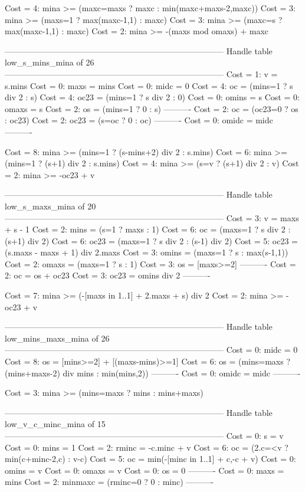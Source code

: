 Cost =  4:  mina >= (maxc=maxs ? maxc : min(maxc+maxs-2,maxc))
Cost =  3:  mina >= (maxs=1 ? max(maxc-1,1) : maxc)
Cost =  3:  mina >= (maxc=s ? max(maxc-1,1) : maxc)
Cost =  2:  mina >= -(maxs mod omaxs) + maxc

--------------------------------------------------------------------------------
Handle table low_s_mins_mina of 26
--------------------------------------------------------------------------------
Cost =  1:  v     = s.mins
Cost =  0:  maxs  = mins
Cost =  0:  midc  = 0
Cost =  4:  oc    = (mins=1 ? s div 2 : s)
Cost =  4:  oc23  = (mins=1 ? s div 2 : 0)
Cost =  0:  omins = s
Cost =  0:  omaxs = s
Cost =  2:  os    = (mins=1 ? 0 : s)
----------
Cost =  2:  oc    = (oc23=0 ? os : oc23)
Cost =  2:  oc23  = (s=oc ? 0 : oc)
----------
Cost =  0:  omidc = midc
----------

Cost =  8:  mina >= (mins=1 ? (s-mins+2) div 2 : s.mins)
Cost =  6:  mina >= (mins=1 ? (s+1) div 2 : s.mins)
Cost =  4:  mina >= (s=v ? (s+1) div 2 : v)
Cost =  2:  mina >= -oc23 + v

--------------------------------------------------------------------------------
Handle table low_s_maxs_mina of 20
--------------------------------------------------------------------------------
Cost =  3:  v     = maxs + s - 1
Cost =  2:  mins  = (s=1 ? maxs : 1)
Cost =  6:  oc    = (maxs=1 ? s div 2 : (s+1) div 2)
Cost =  6:  oc23  = (maxs=1 ? s div 2 : (s-1) div 2)
Cost =  5:  oc23  = (s.maxs - maxs + 1) div 2.maxs
Cost =  3:  omins = (maxs=1 ? s : max(s-1,1))
Cost =  2:  omaxs = (maxs=1 ? s : 1)
Cost =  3:  os    = [maxs>=2]
----------
Cost =  2:  oc    = os + oc23
Cost =  3:  oc23  = omins div 2
----------

Cost =  7:  mina >= (-[maxs in 1..1] + 2.maxs + s) div 2
Cost =  2:  mina >= -oc23 + v

--------------------------------------------------------------------------------
Handle table low_mins_maxs_mina of 26
--------------------------------------------------------------------------------
Cost =  0:  midc  = 0
Cost =  8:  os    = [mins>=2] + [(maxs-mins)>=1]
Cost =  6:  os    = (mins=maxs ? (mins+maxs-2) div mins : min(mins,2))
----------
Cost =  0:  omidc = midc
----------

Cost =  3:  mina >= (mins=maxs ? mins : mins+maxs)

--------------------------------------------------------------------------------
Handle table low_v_c_minc_mina of 15
--------------------------------------------------------------------------------
Cost =  0:  s       = v
Cost =  0:  mins    = 1
Cost =  2:  rminc   = -c.minc + v
Cost =  6:  oc      = (2.c=<v ? min(c+minc-2,c) : v-c)
Cost =  5:  oc      = min(-[minc in 1..1] + c,-c + v)
Cost =  0:  omins   = v
Cost =  0:  omaxs   = v
Cost =  0:  os      = 0
----------
Cost =  0:  maxs    = mins
Cost =  2:  minmaxc = (rminc=0 ? 0 : minc)
----------

